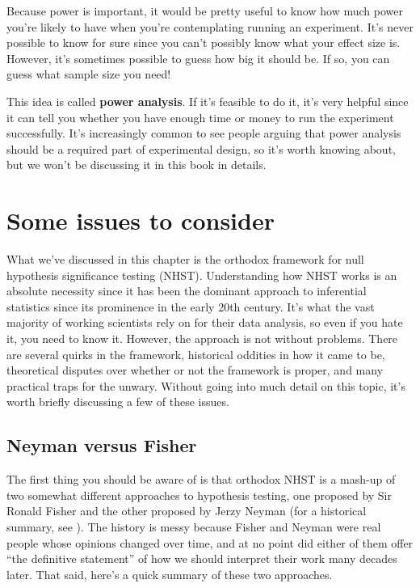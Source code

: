 \documentclass[
  11pt,
  a4paper,
  twoside,symmetric,openright]{book}
\theoremstyle{break}
\theoremstyle{break}
\begin{document}
Because power is important, it would be pretty useful to know how much power you're likely to have when you're contemplating running an experiment. It's never possible to know for sure since you can't possibly know what your effect size is. However, it's sometimes possible to guess how big it should be. If so, you can guess what sample size you need!

This idea is called \textbf{power analysis}. If it's feasible to do it, it's very helpful since it can tell you whether you have enough time or money to run the experiment successfully. It's increasingly common to see people arguing that power analysis should be a required part of experimental design, so it's worth knowing about, but we won't be discussing it in this book in details.

\section{Some issues to consider}\label{nhstmess}

What we've discussed in this chapter is the orthodox framework for null hypothesis significance testing (NHST). Understanding how NHST works is an absolute necessity since it has been the dominant approach to inferential statistics since its prominence in the early 20th century. It's what the vast majority of working scientists rely on for their data analysis, so even if you hate it, you need to know it. However, the approach is not without problems. There are several quirks in the framework, historical oddities in how it came to be, theoretical disputes over whether or not the framework is proper, and many practical traps for the unwary. Without going into much detail on this topic, it's worth briefly discussing a few of these issues.

\subsection{Neyman versus Fisher}\label{neyman-versus-fisher}

The first thing you should be aware of is that orthodox NHST is a mash-up of two somewhat different approaches to hypothesis testing, one proposed by Sir Ronald Fisher and the other proposed by Jerzy Neyman (for a historical summary, see ). The history is messy because Fisher and Neyman were real people whose opinions changed over time, and at no point did either of them offer ``the definitive statement'' of how we should interpret their work many decades later. That said, here's a quick summary of these two approaches.
\end{document}
